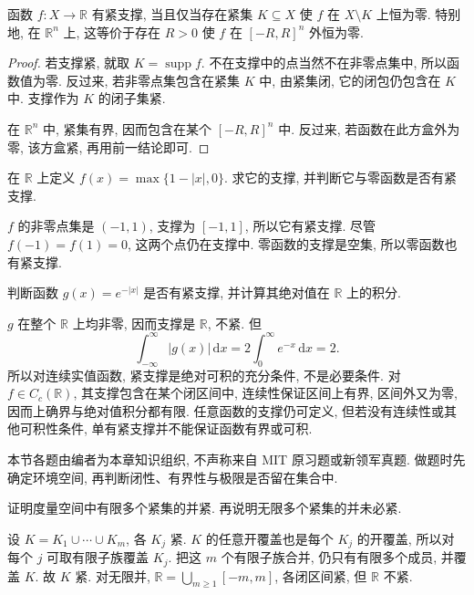 \begin{proposition}[紧支撑的等价表述]
\label{ch:eucompact:compact-support}
函数 $f:X\to\mathbb{R}$ 有紧支撑, 当且仅当存在紧集 $K\subseteq X$ 使 $f$ 在 $X\setminus K$ 上恒为零. 特别地, 在 $\mathbb{R}^n$ 上, 这等价于存在 $R>0$ 使 $f$ 在 $[-R,R]^n$ 外恒为零.
\end{proposition}
\begin{proof}
若支撑紧, 就取 $K=\operatorname{supp}f$. 不在支撑中的点当然不在非零点集中, 所以函数值为零. 反过来, 若非零点集包含在紧集 $K$ 中, 由紧集闭, 它的闭包仍包含在 $K$ 中. 支撑作为 $K$ 的闭子集紧.

在 $\mathbb{R}^n$ 中, 紧集有界, 因而包含在某个 $[-R,R]^n$ 中. 反过来, 若函数在此方盒外为零, 该方盒紧, 再用前一结论即可.
\end{proof}

\begin{example}
在 $\mathbb{R}$ 上定义 $f(x)=\max\{1-|x|,0\}$. 求它的支撑, 并判断它与零函数是否有紧支撑.
\end{example}
\begin{solution}
$f$ 的非零点集是 $(-1,1)$, 支撑为 $[-1,1]$, 所以它有紧支撑. 尽管 $f(-1)=f(1)=0$, 这两个点仍在支撑中. 零函数的支撑是空集, 所以零函数也有紧支撑.
\end{solution}

\begin{example}
判断函数 $g(x)=e^{-|x|}$ 是否有紧支撑, 并计算其绝对值在 $\mathbb{R}$ 上的积分.
\end{example}
\begin{solution}
$g$ 在整个 $\mathbb{R}$ 上均非零, 因而支撑是 $\mathbb{R}$, 不紧. 但
\[
 \int_{-\infty}^{\infty}|g(x)|\,\mathrm{d}x
 =2\int_0^\infty e^{-x}\,\mathrm{d}x=2.
\]
所以对连续实值函数, 紧支撑是绝对可积的充分条件, 不是必要条件. 对 $f\in C_c(\mathbb{R})$, 其支撑包含在某个闭区间中, 连续性保证区间上有界, 区间外又为零, 因而上确界与绝对值积分都有限. 任意函数的支撑仍可定义, 但若没有连续性或其他可积性条件, 单有紧支撑并不能保证函数有界或可积.
\end{solution}

\label{ch:eucompact:exercises}

本节各题由编者为本章知识组织, 不声称来自 MIT 原习题或新领军真题. 做题时先确定环境空间, 再判断闭性、有界性与极限是否留在集合中.

\begin{exercise}
\label{ch:eucompact:ex-finite-union}
证明度量空间中有限多个紧集的并紧. 再说明无限多个紧集的并未必紧.
\end{exercise}
\begin{solution}
设 $K=K_1\cup\cdots\cup K_m$, 各 $K_j$ 紧. $K$ 的任意开覆盖也是每个 $K_j$ 的开覆盖, 所以对每个 $j$ 可取有限子族覆盖 $K_j$. 把这 $m$ 个有限子族合并, 仍只有有限多个成员, 并覆盖 $K$. 故 $K$ 紧. 对无限并, $\mathbb{R}=\bigcup_{m\geq1}[-m,m]$, 各闭区间紧, 但 $\mathbb{R}$ 不紧.
\end{solution}

